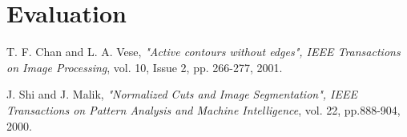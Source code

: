 \documentclass{article}
\begin{document}
  \section{Evaluation}
  
  
	\begin{thebibliography}{9}
	
	\bibitem{[ChanVese01]}
	T. F. Chan and L. A. Vese,
	\emph{"Active contours without edges", IEEE Transactions on Image Processing},
	vol. 10, Issue 2, pp. 266-277, 2001.
	
	
	\bibitem{[ShiMalik00]}
	J.  Shi  and  J.  Malik,
	\emph{"Normalized Cuts and Image Segmentation", IEEE Transactions on Pattern Analysis and Machine Intelligence},
	vol. 22, pp.888-904,
	2000.
	
	\end{thebibliography}
\end{document}
